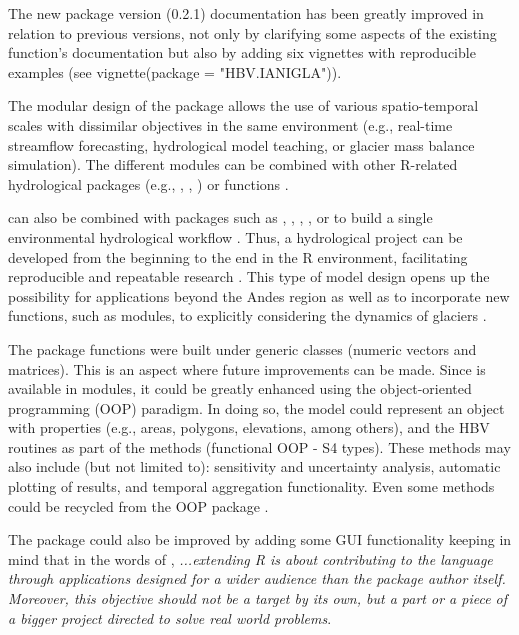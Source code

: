 The new package version (0.2.1) documentation has been greatly improved in relation to previous versions, not only by clarifying
some aspects of the existing function’s documentation but also by adding six vignettes with reproducible examples (see
vignette(package = "HBV.IANIGLA")).

The modular design of the package allows the use of various spatio-temporal scales with dissimilar objectives in the same
environment (e.g., real-time streamflow forecasting, hydrological model teaching, or glacier mass balance simulation). 
The different modules can be combined with other R-related hydrological packages (e.g., , ,
) or functions \citep{evap:2019, de_opt:2016, topmodel:2018}.

 can also be combined with packages such as , , ,
, or  to build a single environmental hydrological workflow 
\citep{tidyverse:2019, sp:2017, raster:2017, hydroGOF:2017, plotly:2019}. Thus, a hydrological project can be developed from the
beginning to the end in the R environment, facilitating reproducible and repeatable research \citep{hutton:2016, ceola:2015}.
This type of model design opens up the possibility for applications beyond the Andes region as well as to incorporate new
functions, such as modules, to explicitly considering the dynamics of glaciers \citep{huss:2010}.

The package functions were built under generic classes (numeric vectors and matrices). This is an aspect where future 
improvements can be made. Since  is available in modules, it could be greatly enhanced using 
the object-oriented programming (OOP) paradigm. In doing so, the model could represent an object with properties (e.g., areas,
polygons, elevations, among others), and the HBV routines as part of the methods (functional OOP - S4 types). These methods may
also include (but not limited to): sensitivity and uncertainty analysis, automatic plotting of results, and temporal aggregation
functionality. Even some methods could be recycled from the  OOP package \citep{toum:2020}.

The package could also be improved by adding some GUI functionality keeping in mind that in the
words of \citet{chambers:2017}, \textit{...extending R is about contributing to the language through applications designed 
for a wider audience than the package author itself. Moreover, this objective should not be a target by its own, but a 
part or a piece of a bigger project directed to solve real world problems}.


